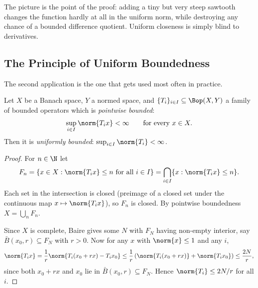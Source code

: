 \begin{center}
\end{center}

The picture is the point of the proof: adding a tiny but very steep sawtooth changes the function hardly at all in the uniform norm, while destroying any chance of a bounded difference quotient. Uniform closeness is simply blind to derivatives.

\subsection{The Principle of Uniform Boundedness}

The second application is the one that gets used most often in practice.

\begin{theorem}
	Let $X$ be a Banach space, $Y$ a normed space, and $\{T_i\}_{i \in I} \subseteq \Bop(X,Y)$ a family of bounded operators which is \emph{pointwise bounded}:
	$$\sup_{i \in I} \norm{T_i x} < \infty \qquad \text{for every } x \in X.$$
	Then it is \emph{uniformly bounded}: $\sup_{i \in I} \norm{T_i} < \infty$.
\end{theorem}

\begin{proof}
	For $n \in \N$ let
	$$F_n = \{ x \in X : \norm{T_i x} \leq n \text{ for all } i \in I \} = \bigcap_{i \in I} \{x : \norm{T_ix} \leq n\}.$$
	Each set in the intersection is closed (preimage of a closed set under the continuous map $x \mapsto \norm{T_i x}$), so $F_n$ is closed. By pointwise boundedness $X = \bigcup_n F_n$.

	Since $X$ is complete, Baire gives some $N$ with $F_N$ having non-empty interior, say $\bar B(x_0, r) \subseteq F_N$ with $r > 0$. Now for any $x$ with $\norm{x} \leq 1$ and any $i$,
	$$\norm{T_i x} = \frac{1}{r}\norm{T_i (x_0 + rx) - T_i x_0} \leq \frac{1}{r}\left( \norm{T_i(x_0+rx)} + \norm{T_ix_0} \right) \leq \frac{2N}{r},$$
	since both $x_0 + rx$ and $x_0$ lie in $\bar B(x_0,r) \subseteq F_N$. Hence $\norm{T_i} \leq 2N/r$ for all $i$.
\end{proof}

